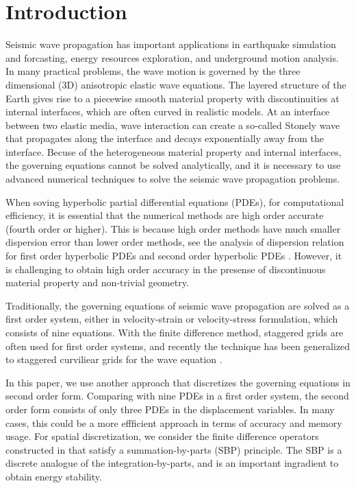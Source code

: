 \section{Introduction}
Seismic wave propagation has important applications in earthquake simulation and forcasting, energy resources exploration, and underground motion analysis. In many practical problems, the wave motion is governed by the three dimensional (3D) anisotropic elastic wave equations. The layered structure of the Earth gives rise to a piecewise smooth material property with discontinuities at internal interfaces, which are often curved in realistic models. At an interface between two elastic media, wave interaction can create a so-called Stonely wave that propagates along the interface and decays exponentially away from the interface.  Becuse of the heterogeneous material property and internal interfaces, the governing equations cannot be solved analytically, and it is necessary to use advanced numerical techniques to solve the seismic wave propagation problems.

When soving hyperbolic partial differential equations (PDEs), for computational efficiency, it is essential that the numerical methods are high order accurate (fourth order or higher). This is because high order methods have much smaller dispersion error than lower order methods, see the analysis of dispersion relation for first order hyperbolic PDEs \cite{Kreiss1972} and second order hyperbolic PDEs \cite{Hagstrom2012}. However, it is challenging to obtain high order accuracy in the presense of discontinuous material property and non-trivial geometry. 

Traditionally, the governing equations of seismic wave propagation are solved as a first order system, either in velocity-strain or velocity-stress formulation, which consists of nine equations. With the finite difference method, staggered grids are often used for first order systems, and recently the technique has been generalized to staggered curviliear grids for the wave equation \cite{OReilly2020}.

In this paper, we use another approach that discretizes the governing equations in second order form. Comparing with nine PDEs in a first order system, the second order form consists of only three PDEs in the displacement variables. In many cases, this could be a more effficient approach in terms of accuracy and memory usage. For spatial discretization, we consider the finite difference operators constructed in \cite{sjogreen2012fourth} that satisfy a summation-by-parts (SBP) principle. The SBP is a discrete analogue of the integration-by-parts, and is an important ingradient to obtain energy stability. 

